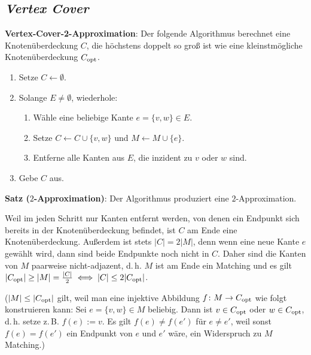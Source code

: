 \pagebreak

\subsection{%
    \emph{Vertex Cover}%
}

\textbf{Vertex-Cover-2-Approximation}:
Der folgende Algorithmus berechnet eine Knotenüberdeckung $C$, die höchstens doppelt so
groß ist wie eine kleinstmögliche Knotenüberdeckung $C_{\text{opt}}$.
\begin{enumerate}
    \item
    Setze $C \leftarrow \emptyset$.

    \item
    Solange $E \not= \emptyset$, wiederhole:
    \begin{enumerate}
        \item
        Wähle eine beliebige Kante $e = \{v, w\} \in E$.

        \item
        Setze $C \leftarrow C \cup \{v, w\}$ und $M \leftarrow M \cup \{e\}$.

        \item
        Entferne alle Kanten aus $E$, die inzident zu $v$ oder $w$ sind.
    \end{enumerate}

    \item
    Gebe $C$ aus.
\end{enumerate}

\linie

\textbf{Satz ($2$-Approximation)}:
Der Algorithmus produziert eine $2$-Approximation.

\begin{Beweis}
    Weil im jeden Schritt nur Kanten entfernt werden, von denen ein Endpunkt sich bereits in der
    Knotenüberdeckung befindet, ist $C$ am Ende eine Knotenüberdeckung.
    Außerdem ist stets $|C| = 2|M|$, denn wenn eine neue Kante $e$ gewählt wird, dann sind beide
    Endpunkte noch nicht in $C$.
    Daher sind die Kanten von $M$ paarweise nicht-adjazent,
    d.\,h. $M$ ist am Ende ein Matching und es gilt
    $|C_{\text{opt}}| \ge |M| = \frac{|C|}{2} \iff |C| \le 2|C_{\text{opt}}|$.

    ($|M| \le |C_{\text{opt}}|$ gilt, weil man eine injektive Abbildung
    $f\colon M \to C_{\text{opt}}$ wie folgt konstruieren kann:
    Sei $e = \{v, w\} \in M$ beliebig.
    Dann ist $v \in C_{\text{opt}}$ oder $w \in C_{\text{opt}}$, d.\,h. setze z.\,B. $f(e) := v$.
    Es gilt $f(e) \not= f(e')$ für $e \not= e'$,
    weil sonst $f(e) = f(e')$ ein Endpunkt von $e$ und $e'$ wäre,
    ein Widerspruch zu $M$ Matching.)
\end{Beweis}

